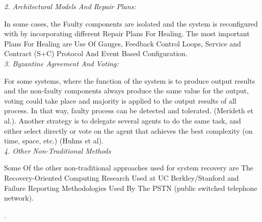\textit{2. Architectural Models And Repair Plans:}

In some cases, the Faulty components 
are isolated and the system is reconfigured 
with by incorporating different Repair Plans For Healing. The most important Plans For Healing are Use Of Gauges, Feedback Control Loops, Service and Contract (S+C) Protocol And Event Based Configuration.\\

\textit{3. Byzantine Agreement And Voting:}

For some systems, where the function of the system is to produce output results and the non-faulty components always produce the same value for the output, voting could take place and majority is applied to the output results of all process. In that way, faulty process can be detected and tolerated. (Merideth et al.). Another strategy is to delegate several agents to do the same task, and either select directly or vote on the agent that achieves the best complexity (on time, space, etc.) (Huhns et al).\\

\textit{4. Other Non-Traditional Methods}

Some Of the other non-traditional approaches used for system recovery are The Recovery-Oriented Computing Research Used at UC Berkley/Stanford and Failure Reporting Methodologies Used By The PSTN (public switched telephone network). 

\cite{Ghosh:SelfHealingSurvey:2007}.\\








